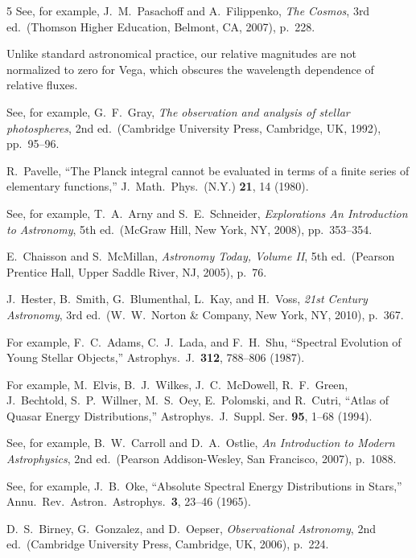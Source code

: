 \documentclass[12pt,aps,prb,preprint]{revtex4}   %
\begin{document}
\begin{thebibliography}{5}
See, for example, J.\ M.\ Pasachoff and A.\ Filippenko, \textsl{The Cosmos}, 3rd ed.\ (Thomson Higher Education, Belmont, CA, 2007), p.\ 228.

Unlike standard astronomical practice, our relative magnitudes are not normalized to zero for Vega, which obscures the wavelength dependence of relative fluxes.

See, for example, G.\ F.\ Gray, \textsl{The observation and analysis of stellar photospheres}, 2nd ed.\ (Cambridge University Press, Cambridge, UK, 1992), pp.\ 95--96.

R.\ Pavelle, ``The Planck integral cannot be evaluated in terms of a finite series of elementary functions,'' J.\ Math.\ Phys.\ (N.Y.) {\bf 21}, 14 (1980).

See, for example, T.\ A.\ Arny and S.\ E.\ Schneider, \textsl{Explorations An Introduction to Astronomy}, 5th ed.\ (McGraw Hill, New York, NY, 2008), pp.\ 353--354.

E.\ Chaisson and S.\ McMillan, \textsl{Astronomy Today, Volume II}, 5th ed.\ (Pearson Prentice Hall, Upper Saddle River, NJ, 2005), p.\ 76.

J.\ Hester, B.\ Smith, G.\ Blumenthal, L.\ Kay, and H.\ Voss, \textsl{21st Century Astronomy}, 3rd ed.\ (W.\ W.\ Norton \& Company, New York, NY, 2010), p.\ 367.

For example, F.\ C.\ Adams, C.\ J.\ Lada, and F.\ H.\ Shu, ``Spectral Evolution of Young Stellar Objects,'' Astrophys.\ J.\ {\bf 312}, 788--806 (1987).

For example, M.\ Elvis, B.\ J.\ Wilkes, J.\ C.\ McDowell, R.\ F.\ Green, J.\ Bechtold, S.\ P.\ Willner, M.\ S.\ Oey, E.\ Polomski, and R.\ Cutri, ``Atlas of Quasar Energy Distributions,'' Astrophys.\ J.\ Suppl. Ser. {\bf 95}, 1--68 (1994).

See, for example, B.\ W.\ Carroll and D.\ A.\ Ostlie, \textsl{An Introduction to Modern Astrophysics}, 2nd ed.\ (Pearson Addison-Wesley, San Francisco, 2007), p.\ 1088.

See, for example, J.\ B.\ Oke, ``Absolute Spectral Energy Distributions in Stars,'' Annu.\ Rev.\ Astron.\ Astrophys.\ {\bf 3}, 23--46 (1965).  

D.\ S.\ Birney, G.\ Gonzalez, and D.\ Oepser, \textsl{Observational Astronomy}, 2nd ed.\ (Cambridge University Press, Cambridge, UK, 2006), p.\ 224.

\end{thebibliography}
\end{document}
